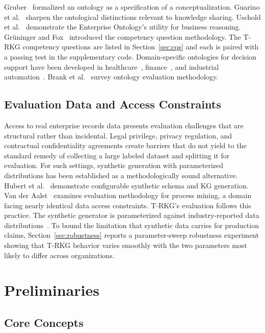\documentclass{ieeeaccess}
\begin{document}
Gruber~\cite{gruber1995} formalized an ontology as a specification of a conceptualization. Guarino et al.~\cite{guarino2009} sharpen the ontological distinctions relevant to knowledge sharing. Uschold et al.~\cite{uschold1998} demonstrate the Enterprise Ontology's utility for business reasoning. Gr\"{u}ninger and Fox~\cite{gruninger1995} introduced the competency question methodology. The T-RKG competency questions are listed in Section~\ref{sec:cqs} and each is paired with a passing test in the supplementary code. Domain-specific ontologies for decision support have been developed in healthcare~\cite{schriml2019}, finance~\cite{fibo}, and industrial automation~\cite{ringsquandl2015}. Brank et al.~\cite{brank2005} survey ontology evaluation methodology.

\subsection{Evaluation Data and Access Constraints}

Access to real enterprise records data presents evaluation challenges that are structural rather than incidental. Legal privilege, privacy regulation, and contractual confidentiality agreements create barriers that do not yield to the standard remedy of collecting a large labeled dataset and splitting it for evaluation. For such settings, synthetic generation with parameterized distributions has been established as a methodologically sound alternative. Hubert et al.~\cite{pygraft} demonstrate configurable synthetic schema and KG generation. Van der Aalst~\cite{vanderaalst2016} examines evaluation methodology for process mining, a domain facing nearly identical data access constraints. T-RKG's evaluation follows this practice. The synthetic generator is parameterized against industry-reported data distributions~\cite{databerg,igrm}. To bound the limitation that synthetic data carries for production claims, Section~\ref{sec:robustness} reports a parameter-sweep robustness experiment showing that T-RKG behavior varies smoothly with the two parameters most likely to differ across organizations.

\section{Preliminaries}

\subsection{Core Concepts}
\end{document}
